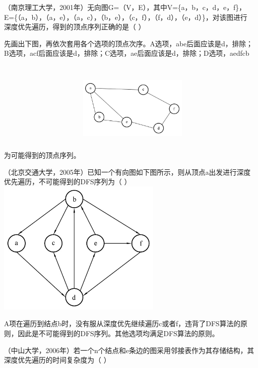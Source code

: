 \question （南京理工大学，2001年）无向图G=（V，E），其中V=\{a，b，c，d，e，f\}，E=\{（a，b），（a，e），（a，c），（b，e），（c，f），（f，d），（e，d）\}，对该图进行深度优先遍历，得到的顶点序列正确的是（
）
\par{}
\begin{solution}先画出下图，再依次套用各个选项的顶点次序。A选项，abe后面应该是d，排除；B选项，acf后面应该是d，排除；C选项，ae后面应该是d，排除；D选项，aedfcb为可能得到的顶点序列。
\includegraphics[width=2.08333in,height=2.08333in]{computerassets/cc2b9294e0c91ea82d13cd032d0b3342.jpeg}
\end{solution}
\question （北京交通大学，2005年）已知一个有向图如下图所示，则从顶点a出发进行深度优先遍历，不可能得到的DFS序列为（
）
\includegraphics[width=3.12500in,height=2.57292in]{computerassets/b49915e01029e13a40983c900a23f874.jpeg}
\par{}
\begin{solution}A项在遍历到结点b时，没有服从深度优先继续遍历c或者f，违背了DFS算法的原则，因此是不可能得到的DFS序列。其他选项均满足DFS算法的原则。
\end{solution}
\question （中山大学，2006年）若一个n个结点和e条边的图采用邻接表作为其存储结构，其深度优先遍历的时间复杂度为（
）
\par\fourch{}{}{\textcolor{red}{}}{}
